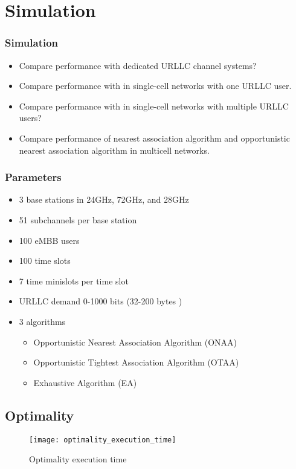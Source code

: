 \section{Simulation}
\begin{frame}
  \frametitle{Simulation}
  \begin{itemize}
    \item Compare performance with dedicated URLLC channel systems?
    \item Compare performance with \cite{AVS20} in single-cell networks with one URLLC user.
    \item Compare performance with \cite{YZR21} in single-cell networks with multiple URLLC users?
    \item Compare performance of nearest association algorithm and opportunistic nearest association algorithm in multicell networks.
  \end{itemize}
\end{frame}

\begin{frame}
  \frametitle{Parameters}
  \begin{itemize}
    \item 3 base stations in 24GHz, 72GHz, and 28GHz \cite{SRRTGKRKPJ16}
    \item 51 subchannels per base station
    \item 100 eMBB users
    \item 100 time slots
    \item 7 time minislots per time slot
    \item URLLC demand 0-1000 bits (32-200 bytes \cite{3GPP17})
    \item 3 algorithms
      \begin{itemize}
        \item Opportunistic Nearest Association Algorithm (ONAA)
        \item Opportunistic Tightest Association Algorithm (OTAA)
        \item Exhaustive Algorithm (EA)
      \end{itemize}
  \end{itemize}
\end{frame}

\subsection{Optimality}
\begin{frame}
  \begin{figure}
    \texttt{[image: optimality\_execution\_time]}
    \caption{Optimality execution time}
  \end{figure}
\end{frame}

